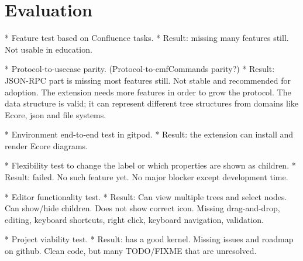 \chapter{Evaluation}\label{chap:evaluation}


* Feature test based on Confluence tasks.
  * Result: missing many features still. Not usable in education.

* Protocol-to-usecase parity. (Protocol-to-emfCommands parity?)
  * Result: JSON-RPC part is missing most features still. Not stable and recommended for adoption. The extension needs more features in order to grow the protocol. The data structure is valid; it can represent different tree structures from domains like Ecore, json and file systems.

* Environment end-to-end test in gitpod.
  * Result: the extension can install and render Ecore diagrams.

* Flexibility test to change the label or which properties are shown as children.
  * Result: failed. No such feature yet. No major blocker except development time.

* Editor functionality test.
  * Result: Can view multiple trees and select nodes. Can show/hide children. Does not show correct icon. Missing drag-and-drop, editing, keyboard shortcuts, right click, keyboard navigation, validation.

* Project viability test.
  * Result: has a good kernel. Missing issues and roadmap on github. Clean code, but many TODO/FIXME that are unresolved. 
  
